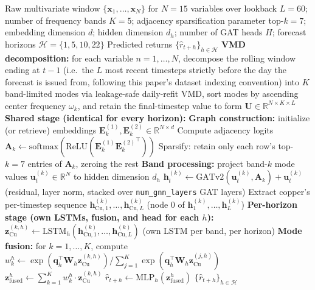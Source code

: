\documentclass[journal]{IEEEtran}
\begin{document}
\begin{algorithm}[!t]
\caption{VMD-MFGNN forward pass}
\label{alg:vmdmfgnn}
\begin{algorithmic}[1]
\Require Raw multivariate window $\{\mathbf{x}_1,\ldots,\mathbf{x}_N\}$ for $N=15$ variables over lookback $L=60$; number of frequency bands $K=5$; adjacency sparsification parameter top-$k=7$; embedding dimension $d$; hidden dimension $d_h$; number of GAT heads $H$; forecast horizons $\mathcal{H}=\{1,5,10,22\}$
\Ensure Predicted returns $\{\hat{r}_{t+h}\}_{h\in\mathcal{H}}$
\State \textbf{VMD decomposition:} for each variable $n=1,\ldots,N$, decompose the rolling window ending at $t-1$ (i.e.\ the $L$ most recent timesteps strictly before the day the forecast is issued from, following this paper's dataset indexing convention) into $K$ band-limited modes via leakage-safe daily-refit VMD, sort modes by ascending center frequency $\omega_k$, and retain the final-timestep value to form $\mathbf{U} \in \mathbb{R}^{N \times K \times L}$
\Statex \textbf{Shared stage (identical for every horizon):}
    \State \textbf{Graph construction:} initialize (or retrieve) embeddings $\mathbf{E}^{(1)}_k, \mathbf{E}^{(2)}_k \in \mathbb{R}^{N \times d}$
    \State Compute adjacency logits $\mathbf{A}_k \leftarrow \text{softmax}(\text{ReLU}(\mathbf{E}^{(1)}_k {\mathbf{E}^{(2)}_k}^\top))$
    \State Sparsify: retain only each row's top-$k=7$ entries of $\mathbf{A}_k$, zeroing the rest
    \State \textbf{Band processing:} project band-$k$ mode values $\mathbf{u}^{(k)}_t \in \mathbb{R}^N$ to hidden dimension $d_h$
        \State $\mathbf{h}^{(k)}_{t} \leftarrow \text{GATv2}(\mathbf{u}^{(k)}_{t}, \mathbf{A}_k) + \mathbf{u}^{(k)}_{t}$ (residual, layer norm, stacked over \texttt{num\_gnn\_layers} GAT layers)
    \EndFor
    \State Extract copper's per-timestep sequence $\mathbf{h}^{(k)}_{\text{Cu},1},\ldots,\mathbf{h}^{(k)}_{\text{Cu},L}$ (node 0 of $\mathbf{h}^{(k)}_{1},\ldots,\mathbf{h}^{(k)}_{L}$)
\EndFor
\Statex \textbf{Per-horizon stage (own LSTMs, fusion, and head for each $h$):}
        \State $\mathbf{z}^{(k,h)}_{\text{Cu}} \leftarrow \text{LSTM}_h(\mathbf{h}^{(k)}_{\text{Cu},1}, \ldots, \mathbf{h}^{(k)}_{\text{Cu},L})$ (own LSTM per band, per horizon)
    \EndFor
    \State \textbf{Mode fusion:} for $k=1,\ldots,K$, compute $w_k^h \leftarrow \exp(\mathbf{q}_h^\top \mathbf{W}_h\mathbf{z}^{(k,h)}_{\text{Cu}}) / \sum_{j=1}^{K} \exp(\mathbf{q}_h^\top \mathbf{W}_h\mathbf{z}^{(j,h)}_{\text{Cu}})$
    \State $\mathbf{z}_{\text{fused}}^h \leftarrow \sum_{k=1}^{K} w_k^h \cdot \mathbf{z}^{(k,h)}_{\text{Cu}}$
    \State $\hat{r}_{t+h} \leftarrow \text{MLP}_h(\mathbf{z}_{\text{fused}}^h)$
\EndFor
\State \Return $\{\hat{r}_{t+h}\}_{h\in\mathcal{H}}$
\end{algorithmic}
\end{algorithm}
\end{document}
